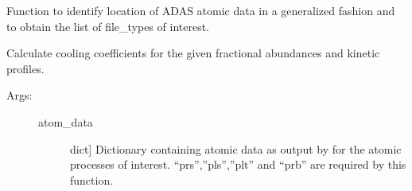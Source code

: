 \documentclass[letterpaper,10pt,english]{sphinxmanual}
\begin{document}

\begin{fulllineitems}
\label{\detokenize{aurora:aurora.atomic.get_atomdat_info}}
Function to identify location of ADAS atomic data in a generalized fashion
and to obtain the list of file\_types of interest.

\end{fulllineitems}


\begin{fulllineitems}
\label{\detokenize{aurora:aurora.atomic.get_cooling_factors}}
Calculate cooling coefficients for the given fractional abundances and kinetic profiles.
\begin{description}
\item[{Args:}] \leavevmode\begin{description}
\item[{atom\_data}] \leavevmode{[}dict{]}
Dictionary containing atomic data as output by {\hyperref[\detokenize{aurora:aurora.atomic.get_atom_data}]{}}
for the atomic processes of interest. “prs”,”pls”,”plt” and “prb” are required by this function.

\end{description}

\end{description}

\end{fulllineitems}

\end{document}
